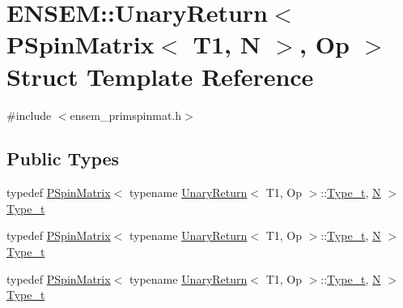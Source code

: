 \hypertarget{structENSEM_1_1UnaryReturn_3_01PSpinMatrix_3_01T1_00_01N_01_4_00_01Op_01_4}{}\section{E\+N\+S\+EM\+:\+:Unary\+Return$<$ P\+Spin\+Matrix$<$ T1, N $>$, Op $>$ Struct Template Reference}
\label{structENSEM_1_1UnaryReturn_3_01PSpinMatrix_3_01T1_00_01N_01_4_00_01Op_01_4}


{\ttfamily \#include $<$ensem\+\_\+primspinmat.\+h$>$}

\subsection*{Public Types}
\begin{DoxyCompactItemize}
\item 
typedef \mbox{\hyperlink{classENSEM_1_1PSpinMatrix}{P\+Spin\+Matrix}}$<$ typename \mbox{\hyperlink{structENSEM_1_1UnaryReturn}{Unary\+Return}}$<$ T1, Op $>$\+::\mbox{\hyperlink{structENSEM_1_1UnaryReturn_3_01PSpinMatrix_3_01T1_00_01N_01_4_00_01Op_01_4_a722e6dd982e4f02e3281bc8a3b8f8bfa}{Type\+\_\+t}}, \mbox{\hyperlink{adat__devel_2lib_2hadron_2operator__name__util_8cc_a7722c8ecbb62d99aee7ce68b1752f337}{N}} $>$ \mbox{\hyperlink{structENSEM_1_1UnaryReturn_3_01PSpinMatrix_3_01T1_00_01N_01_4_00_01Op_01_4_a722e6dd982e4f02e3281bc8a3b8f8bfa}{Type\+\_\+t}}
\item 
typedef \mbox{\hyperlink{classENSEM_1_1PSpinMatrix}{P\+Spin\+Matrix}}$<$ typename \mbox{\hyperlink{structENSEM_1_1UnaryReturn}{Unary\+Return}}$<$ T1, Op $>$\+::\mbox{\hyperlink{structENSEM_1_1UnaryReturn_3_01PSpinMatrix_3_01T1_00_01N_01_4_00_01Op_01_4_a722e6dd982e4f02e3281bc8a3b8f8bfa}{Type\+\_\+t}}, \mbox{\hyperlink{adat__devel_2lib_2hadron_2operator__name__util_8cc_a7722c8ecbb62d99aee7ce68b1752f337}{N}} $>$ \mbox{\hyperlink{structENSEM_1_1UnaryReturn_3_01PSpinMatrix_3_01T1_00_01N_01_4_00_01Op_01_4_a722e6dd982e4f02e3281bc8a3b8f8bfa}{Type\+\_\+t}}
\item 
typedef \mbox{\hyperlink{classENSEM_1_1PSpinMatrix}{P\+Spin\+Matrix}}$<$ typename \mbox{\hyperlink{structENSEM_1_1UnaryReturn}{Unary\+Return}}$<$ T1, Op $>$\+::\mbox{\hyperlink{structENSEM_1_1UnaryReturn_3_01PSpinMatrix_3_01T1_00_01N_01_4_00_01Op_01_4_a722e6dd982e4f02e3281bc8a3b8f8bfa}{Type\+\_\+t}}, \mbox{\hyperlink{adat__devel_2lib_2hadron_2operator__name__util_8cc_a7722c8ecbb62d99aee7ce68b1752f337}{N}} $>$ \mbox{\hyperlink{structENSEM_1_1UnaryReturn_3_01PSpinMatrix_3_01T1_00_01N_01_4_00_01Op_01_4_a722e6dd982e4f02e3281bc8a3b8f8bfa}{Type\+\_\+t}}
\end{DoxyCompactItemize}


